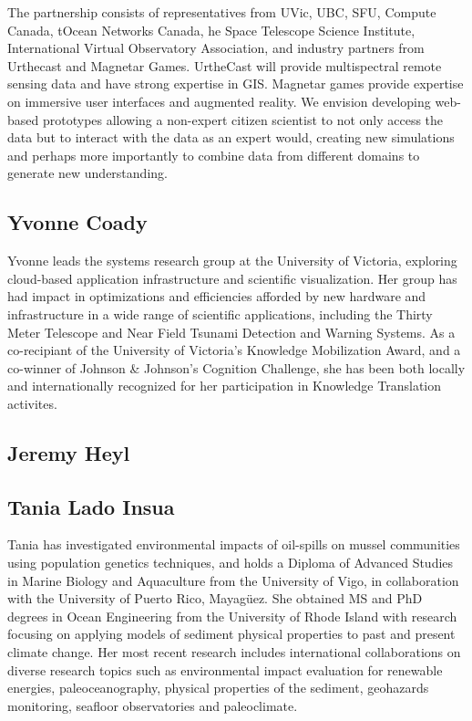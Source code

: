The partnership consists of representatives from UVic, UBC, SFU,
Compute Canada, tOcean Networks Canada, he Space Telescope Science
Institute, International Virtual Observatory Association, and industry
partners from Urthecast and Magnetar Games.  UrtheCast will provide
multispectral remote sensing data and have strong expertise in GIS.
Magnetar games provide expertise on immersive user interfaces and
augmented reality.  We envision developing web-based prototypes
allowing a non-expert citizen scientist to not only access the data
but to interact with the data as an expert would, creating new
simulations and perhaps more importantly to combine data from
different domains to generate new understanding.

\subsection*{Yvonne Coady} 
Yvonne leads the systems research group at the University of Victoria, exploring cloud-based application infrastructure and scientific visualization.  Her group has had impact in optimizations and efficiencies afforded by new hardware and infrastructure in a wide range of scientific applications, including the Thirty Meter Telescope and Near Field Tsunami Detection and Warning Systems.  As a co-recipiant of the University of Victoria's Knowledge Mobilization Award, and a co-winner of Johnson & Johnson's Cognition Challenge, she has been both locally and internationally recognized for her participation in Knowledge Translation activites.


\subsection*{Jeremy Heyl}

\subsection*{Tania Lado Insua}
Tania has investigated environmental impacts of oil-spills on mussel communities using population genetics techniques, and holds a Diploma of Advanced Studies in Marine Biology and Aquaculture from the University of Vigo, in collaboration with the University of Puerto Rico, Mayagüez.  She obtained MS and PhD degrees in Ocean Engineering from the University of Rhode Island with research focusing on applying models of sediment physical properties to past and present climate change. Her most recent research includes international collaborations on diverse research topics such as environmental impact evaluation for renewable energies, paleoceanography, physical properties of the sediment, geohazards monitoring, seafloor observatories and paleoclimate. 


